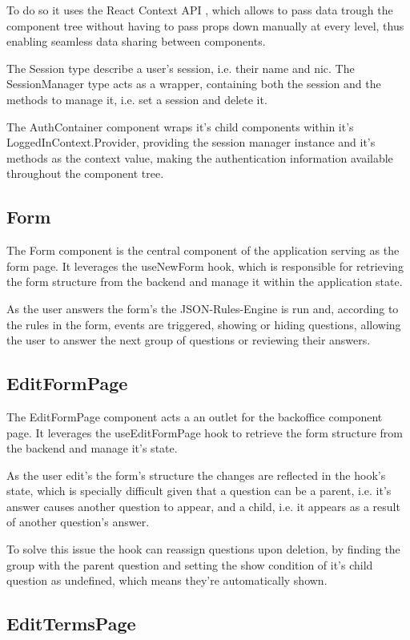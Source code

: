 To do so it uses the React Context API \cite{React_Context_API}, which allows to pass data trough the component tree without having to pass props down manually at every level, thus enabling seamless data sharing between components.

The Session type describe a user's session, i.e. their name and nic. The SessionManager type acts as a wrapper, containing both the session and the methods to manage it, i.e. set a session and delete it.

The AuthContainer component wraps it's child components within it's LoggedInContext.Provider, providing the session manager instance and it's methods as the context value, making the authentication information available throughout the component tree.

\subsection{Form}
The Form component is the central component of the application serving as the form page. It leverages the useNewForm hook, which is responsible for retrieving the form structure from the backend and manage it within the application state.

As the user answers the form's the JSON-Rules-Engine is run and, according to the rules in the form, events are triggered, showing or hiding questions, allowing the user to answer the next group of questions or reviewing their answers.

\subsection{EditFormPage}
The EditFormPage component acts a an outlet for the backoffice component page. It leverages the useEditFormPage hook to retrieve the form structure from the backend and manage it's state.

As the user edit's the form's structure the changes are reflected in the hook's state, which is specially difficult given that a question can be a parent, i.e. it's answer causes another question to appear, and a child, i.e. it appears as a result of another question's answer.

To solve this issue the hook can reassign questions upon deletion, by finding the group with the parent question and setting the show condition of it's child question as undefined, which means they're automatically shown.

\subsection{EditTermsPage}

